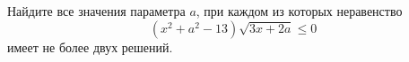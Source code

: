 \begin{ex}
	\begin{condition}
		Найдите все значения параметра \( a \), при каждом из которых неравенство \[ (x^2+a^2-13)\sqrt{3x+2a}\le0 \] имеет не более двух решений.
	\end{condition}
	\answer{\( (-\infty;-3]\cup[-\sqrt{13};+\infty) \)}
\end{ex}